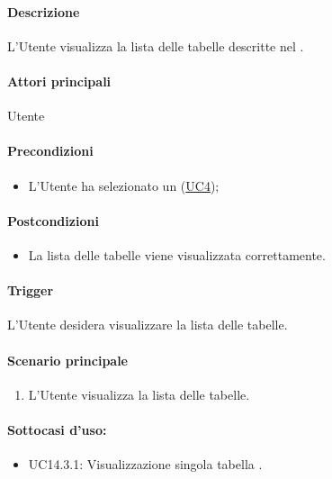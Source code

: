 \paragraph*{Descrizione}
L'Utente visualizza la lista delle tabelle descritte nel .

\paragraph*{Attori principali}
Utente

\paragraph*{Precondizioni}
\begin{itemize}
  \item L'Utente ha selezionato un  (\hyperref[UC4]{UC4});
\end{itemize}

\paragraph*{Postcondizioni}
\begin{itemize}
  \item La lista delle tabelle viene visualizzata correttamente.
\end{itemize}

\paragraph*{Trigger}
L'Utente desidera visualizzare la lista delle tabelle.

\paragraph*{Scenario principale}
\begin{enumerate}
  \item L'Utente visualizza la lista delle tabelle.
\end{enumerate}

\paragraph*{Sottocasi d'uso:}
\begin{itemize}
  \item UC14.3.1: Visualizzazione singola tabella .
\end{itemize}

